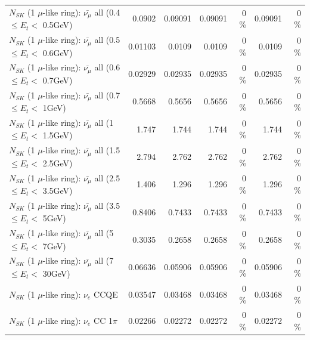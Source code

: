 \begin{table}
\begin{tabular}{| l | r | r | r  r | r  r |}
 $N_{SK}$ (1 $\mu$-like ring): $\bar{\nu_{\mu}}$ all (0.4 $\leq E_{t} <$ 0.5GeV) &          0.0902 &         0.09091 &         0.09091 &        0 \%  &         0.09091 &        0 \%  \\ 
 $N_{SK}$ (1 $\mu$-like ring): $\bar{\nu_{\mu}}$ all (0.5 $\leq E_{t} <$ 0.6GeV) &         0.01103 &          0.0109 &          0.0109 &        0 \%  &          0.0109 &        0 \%  \\ 
 $N_{SK}$ (1 $\mu$-like ring): $\bar{\nu_{\mu}}$ all (0.6 $\leq E_{t} <$ 0.7GeV) &         0.02929 &         0.02935 &         0.02935 &        0 \%  &         0.02935 &        0 \%  \\ 
   $N_{SK}$ (1 $\mu$-like ring): $\bar{\nu_{\mu}}$ all (0.7 $\leq E_{t} <$ 1GeV) &          0.5668 &          0.5656 &          0.5656 &        0 \%  &          0.5656 &        0 \%  \\ 
   $N_{SK}$ (1 $\mu$-like ring): $\bar{\nu_{\mu}}$ all (1 $\leq E_{t} <$ 1.5GeV) &           1.747 &           1.744 &           1.744 &        0 \%  &           1.744 &        0 \%  \\ 
 $N_{SK}$ (1 $\mu$-like ring): $\bar{\nu_{\mu}}$ all (1.5 $\leq E_{t} <$ 2.5GeV) &           2.794 &           2.762 &           2.762 &        0 \%  &           2.762 &        0 \%  \\ 
 $N_{SK}$ (1 $\mu$-like ring): $\bar{\nu_{\mu}}$ all (2.5 $\leq E_{t} <$ 3.5GeV) &           1.406 &           1.296 &           1.296 &        0 \%  &           1.296 &        0 \%  \\ 
   $N_{SK}$ (1 $\mu$-like ring): $\bar{\nu_{\mu}}$ all (3.5 $\leq E_{t} <$ 5GeV) &          0.8406 &          0.7433 &          0.7433 &        0 \%  &          0.7433 &        0 \%  \\ 
     $N_{SK}$ (1 $\mu$-like ring): $\bar{\nu_{\mu}}$ all (5 $\leq E_{t} <$ 7GeV) &          0.3035 &          0.2658 &          0.2658 &        0 \%  &          0.2658 &        0 \%  \\ 
    $N_{SK}$ (1 $\mu$-like ring): $\bar{\nu_{\mu}}$ all (7 $\leq E_{t} <$ 30GeV) &         0.06636 &         0.05906 &         0.05906 &        0 \%  &         0.05906 &        0 \%  \\ 
\hline
\hline
\hline
                                      $N_{SK}$ (1 $\mu$-like ring): $\nu_e$ CCQE &         0.03547 &         0.03468 &         0.03468 &        0 \%  &         0.03468 &        0 \%  \\ 
                                 $N_{SK}$ (1 $\mu$-like ring): $\nu_e$ CC 1$\pi$ &         0.02266 &         0.02272 &         0.02272 &        0 \%  &         0.02272 &        0 \%  \\ 

\end{tabular}
\end{table}

